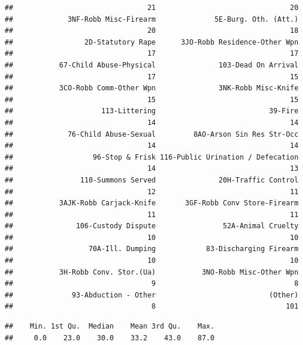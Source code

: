 \documentclass[]{article}
\newenvironment{Shaded}{\begin{snugshade}}{\end{snugshade}}
\newcommand{\KeywordTok}[1]{\textcolor[rgb]{0.13,0.29,0.53}{\textbf{{#1}}}}
\newcommand{\CommentTok}[1]{\textcolor[rgb]{0.56,0.35,0.01}{\textit{{#1}}}}
\newcommand{\NormalTok}[1]{{#1}}
\theoremstyle{definition}
\theoremstyle{definition}
\theoremstyle{remark}
\begin{document}
\begin{verbatim}
##                                21                                20 
##             3NF-Robb Misc-Firearm              5E-Burg. Oth. (Att.) 
##                                20                                18 
##                 2D-Statutory Rape      3JO-Robb Residence-Other Wpn 
##                                17                                17 
##           67-Child Abuse-Physical               103-Dead On Arrival 
##                                17                                15 
##           3CO-Robb Comm-Other Wpn               3NK-Robb Misc-Knife 
##                                15                                15 
##                     113-Littering                           39-Fire 
##                                14                                14 
##             76-Child Abuse-Sexual         8AO-Arson Sin Res Str-Occ 
##                                14                                14 
##                   96-Stop & Frisk 116-Public Urination / Defecation 
##                                14                                13 
##                110-Summons Served               20H-Traffic Control 
##                                12                                11 
##           3AJK-Robb Carjack-Knife       3GF-Robb Conv Store-Firearm 
##                                11                                11 
##               106-Custody Dispute                52A-Animal Cruelty 
##                                10                                10 
##                  70A-Ill. Dumping            83-Discharging Firearm 
##                                10                                10 
##           3H-Robb Conv. Stor.(Ua)           3NO-Robb Misc-Other Wpn 
##                                 9                                 8 
##              93-Abduction - Other                           (Other) 
##                                 8                               101
\end{verbatim}

\begin{Shaded}
\end{Shaded}

\begin{verbatim}
##    Min. 1st Qu.  Median    Mean 3rd Qu.    Max. 
##     0.0    23.0    30.0    33.2    43.0    87.0
\end{verbatim}
\end{document}
